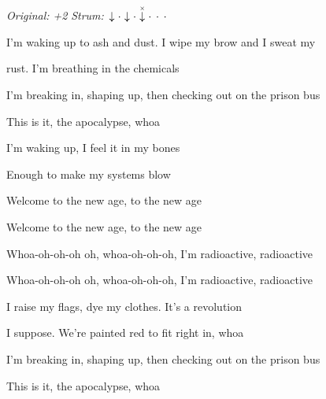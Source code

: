 \begin{song}


\begin{headerbox}
\RaiseBoxWithAccents
\textit{Original: +2} \quad
\textit{Strum:} $\Down\Miss\Down\Miss\ChuckDown\Miss\Miss\Miss$
\end{headerbox}

\begin{hchordbox}
\end{hchordbox}

\Large

\bigskip

 I'm waking up to ash and dust. I wipe my brow and I sweat my \par
{}rust. I'm breathing in the chemicals   \par
{} I'm breaking in, shaping up, then checking out on the prison bus \par
{} This is it, the apocalypse, whoa  \par

\bigskip

I'm waking up, I feel it in my bones \par
Enough to make my systems blow \par
{}Welcome to the new age,  to the new age \par
{}Welcome to the new age,  to the new age \par
{} Whoa-oh-oh-oh oh,  whoa-oh-oh-oh, I'm  radioactive,  radioactive \par
{} Whoa-oh-oh-oh oh,  whoa-oh-oh-oh, I'm  radioactive,  radioactive \par

\bigskip

 I raise my flags, dye my clothes. It's a revolution \par
I suppose. We're painted red to fit right in, whoa  \par
{} I'm breaking in, shaping up, then checking out on the prison bus \par
{} This is it, the apocalypse, whoa  \par


\end{song}
